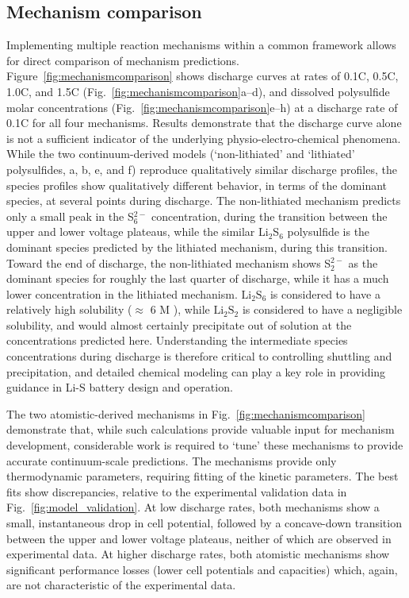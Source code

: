 \documentclass{elsarticle}
\begin{document}
\subsection{Mechanism comparison}
Implementing multiple reaction mechanisms within a common framework allows for direct comparison of mechanism predictions. Figure~\ref{fig:mechanismcomparison} shows discharge curves at rates of 0.1C, 0.5C, 1.0C, and 1.5C (Fig.~\ref{fig:mechanismcomparison}a--d), and dissolved polysulfide molar concentrations (Fig.~\ref{fig:mechanismcomparison}e--h) at a discharge rate of 0.1C  for all four mechanisms. Results demonstrate that the discharge curve alone is not a sufficient indicator of the underlying physio-electro-chemical phenomena.  While the two continuum-derived models (`non-lithiated' and `lithiated' polysulfides, a, b, e, and f) reproduce qualitatively similar discharge profiles, the species profiles show qualitatively different behavior, in terms of the dominant species, at several points during discharge.  The non-lithiated mechanism predicts only a small peak in the S$_6^{2-}$ concentration, during the transition between the upper and lower voltage plateaus, while the similar Li$_2$S$_6$ polysulfide is the dominant species predicted by the lithiated mechanism, during this transition.  Toward the end of discharge, the non-lithiated mechanism shows S$_2^{2-}$ as the dominant species for roughly the last quarter of discharge, while it has a much lower concentration in the lithiated mechanism.  $\mathrm{Li}_2\mathrm{S}_6$ is considered to have a relatively high solubility ($\approx$ 6 M \cite{ANDREI2018469}), while $\mathrm{Li}_2\mathrm{S}_2$ is considered to have a negligible solubility, and would almost certainly precipitate out of solution at the concentrations predicted here.  Understanding the intermediate species concentrations during discharge is therefore critical to controlling shuttling and precipitation, and detailed chemical modeling can play a key role in providing guidance in Li-S battery design and operation.

The two atomistic-derived mechanisms in Fig.~\ref{fig:mechanismcomparison} demonstrate that, while such calculations provide valuable input for mechanism development, considerable work is required to `tune' these mechanisms to provide accurate continuum-scale predictions. The mechanisms provide only thermodynamic parameters, requiring fitting of the kinetic parameters.  The best fits show discrepancies, relative to the experimental validation data in Fig.~\ref{fig:model_validation}. At low discharge rates, both mechanisms show a small, instantaneous drop in cell potential, followed by a concave-down transition between the upper and lower voltage plateaus, neither of which are observed in experimental data. At higher discharge rates, both atomistic mechanisms show significant performance losses (lower cell potentials and capacities) which, again, are not characteristic of the experimental data.
\end{document}
